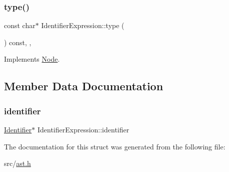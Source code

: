 \mbox{\label{struct_identifier_expression_ab864c277df4f446b14cdc06e2fa5f7ad}} 
\subsubsection{\texorpdfstring{type()}{type()}}
{\footnotesize\ttfamily const char$\ast$ Identifier\+Expression\+::type (\begin{DoxyParamCaption}{ }\end{DoxyParamCaption}) const\hspace{0.3cm}{\ttfamily [inline]}, {\ttfamily [override]}, {\ttfamily [virtual]}}



Implements \hyperlink{struct_node_a82f29420d0a38efcc370352528e94e9b}{Node}.



\subsection{Member Data Documentation}
\mbox{\label{struct_identifier_expression_ae22855c1fc8a900db6cce6e74db3f6cc}} 
\subsubsection{\texorpdfstring{identifier}{identifier}}
{\footnotesize\ttfamily \hyperlink{struct_identifier}{Identifier}$\ast$ Identifier\+Expression\+::identifier}



The documentation for this struct was generated from the following file\+:\begin{DoxyCompactItemize}
\item 
src/\hyperlink{ast_8h}{ast.\+h}\end{DoxyCompactItemize}
